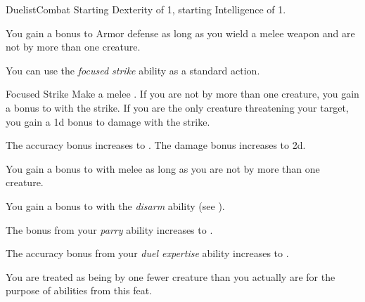     \begin{feat}{Duelist}{Combat}
        \featpre Starting Dexterity of 1, starting Intelligence of 1.

         You gain a  bonus to Armor defense as long as you wield a melee weapon and are not  by more than one creature.

         You can use the \textit{focused strike} ability as a standard action.
        \begin{freeability}{Focused Strike}
            Make a melee .
            If you are not  by more than one creature, you gain a  bonus to  with the strike.
            If you are the only creature threatening your target, you gain a \plus1d bonus to damage with the strike.

            \rankline
             The accuracy bonus increases to .
             The damage bonus increases to \plus2d.
        \end{freeability}

         You gain a  bonus to  with melee  as long as you are not  by more than one creature.

         You gain a  bonus to  with the \textit{disarm} ability (see ).

         The bonus from your \textit{parry} ability increases to .

         The accuracy bonus from your \textit{duel expertise} ability increases to .

         You are treated as being  by one fewer creature than you actually are for the purpose of abilities from this feat.
    \end{feat}

